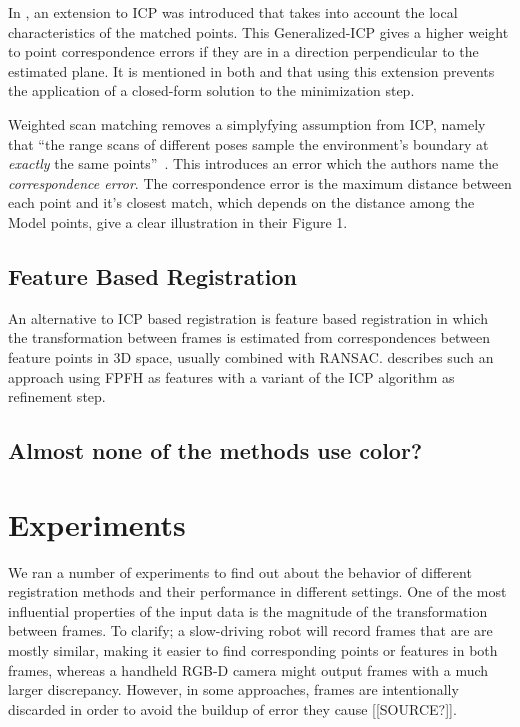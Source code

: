\documentclass[a4paper]{article}
\begin{document}
In \cite{segal2009generalized}, an extension to \ac{ICP} was introduced that takes into account the local characteristics of the matched points. This Generalized-ICP gives a higher weight to point correspondence errors if they are in a direction perpendicular to the estimated plane. It is mentioned in both \cite{rusinkiewicz2001efficient} and \cite{segal2009generalized} that using this extension prevents the application of a closed-form solution to the minimization step.

Weighted scan matching removes a simplyfying assumption from ICP, namely that ``the range scans of different poses sample the environment's boundary at \emph{exactly} the same points''~\cite{pfister2002weighted}. This introduces an error which the authors name the \emph{correspondence error}. The correspondence error is the maximum distance between each point and it's closest match, which depends on the distance among the Model points, \cite{slamet2008boosting} give a clear illustration in their Figure 1. 

\subsection{Feature Based Registration}

An alternative to \ac{ICP} based registration is feature based registration in which the transformation between frames is estimated from correspondences between feature points in 3D space, usually combined with \ac{RANSAC}. \cite{rusu2009fast} describes such an approach using \ac{FPFH} as features with a variant of the \ac{ICP} algorithm as refinement step.


\subsection{Almost none of the methods use color?}


\section{Experiments}

We ran a number of experiments to find out about the behavior of different registration methods and their performance in different settings. One of the most influential properties of the input data is the magnitude of the transformation between frames. To clarify; a slow-driving robot will record frames that are are mostly similar, making it easier to find corresponding points or features in both frames, whereas a handheld RGB-D camera might output frames with a much larger discrepancy. However, in some approaches, frames are intentionally discarded in order to avoid the buildup of error they cause [[SOURCE?]]. 
\end{document}
